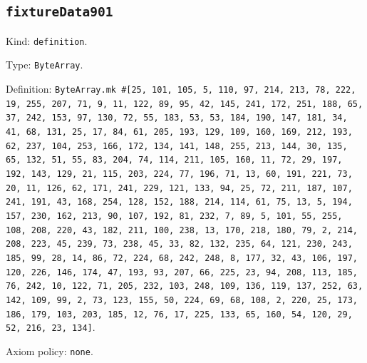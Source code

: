 \documentclass[11pt]{article}
\begin{document}
\subsection*{\texttt{fixtureData901}}
\noindent Kind: \texttt{definition}.\par
\noindent Type: \texttt{ByteArray}.\par
\noindent Definition: \texttt{ByteArray.mk \#[25, 101, 105, 5, 110, 97, 214, 213, 78, 222, 19, 255, 207, 71, 9, 11, 122, 89, 95, 42, 145, 241, 172, 251, 188, 65, 37, 242, 153, 97, 130, 72, 55, 183, 53, 53, 184, 190, 147, 181, 34, 41, 68, 131, 25, 17, 84, 61, 205, 193, 129, 109, 160, 169, 212, 193, 62, 237, 104, 253, 166, 172, 134, 141, 148, 255, 213, 144, 30, 135, 65, 132, 51, 55, 83, 204, 74, 114, 211, 105, 160, 11, 72, 29, 197, 192, 143, 129, 21, 115, 203, 224, 77, 196, 71, 13, 60, 191, 221, 73, 20, 11, 126, 62, 171, 241, 229, 121, 133, 94, 25, 72, 211, 187, 107, 241, 191, 43, 168, 254, 128, 152, 188, 214, 114, 61, 75, 13, 5, 194, 157, 230, 162, 213, 90, 107, 192, 81, 232, 7, 89, 5, 101, 55, 255, 108, 208, 220, 43, 182, 211, 100, 238, 13, 170, 218, 180, 79, 2, 214, 208, 223, 45, 239, 73, 238, 45, 33, 82, 132, 235, 64, 121, 230, 243, 185, 99, 28, 14, 86, 72, 224, 68, 242, 248, 8, 177, 32, 43, 106, 197, 120, 226, 146, 174, 47, 193, 93, 207, 66, 225, 23, 94, 208, 113, 185, 76, 242, 10, 122, 71, 205, 232, 103, 248, 109, 136, 119, 137, 252, 63, 142, 109, 99, 2, 73, 123, 155, 50, 224, 69, 68, 108, 2, 220, 25, 173, 186, 179, 103, 203, 185, 12, 76, 17, 225, 133, 65, 160, 54, 120, 29, 52, 216, 23, 134]}.\par
\noindent Axiom policy: \texttt{none}.\par
\end{document}
